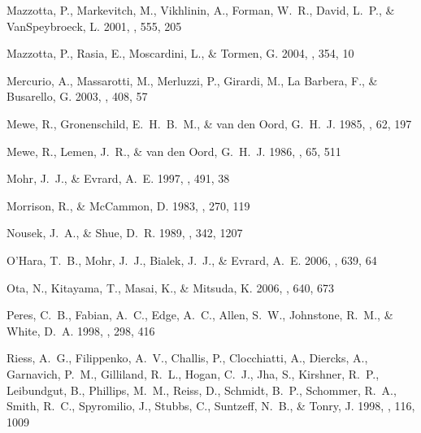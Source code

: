 \documentclass[12pt,preprint]{aastex}
\begin{document}
\begin{thebibliography}{}
{Mazzotta}, P., {Markevitch}, M., {Vikhlinin}, A., {Forman}, W.~R., {David},
  L.~P., \& {VanSpeybroeck}, L. 2001, \apj, 555, 205

{Mazzotta}, P., {Rasia}, E., {Moscardini}, L., \& {Tormen}, G. 2004, \mnras,
  354, 10

{Mercurio}, A., {Massarotti}, M., {Merluzzi}, P., {Girardi}, M., {La Barbera},
  F., \& {Busarello}, G. 2003, \aap, 408, 57

{Mewe}, R., {Gronenschild}, E.~H.~B.~M., \& {van den Oord}, G.~H.~J. 1985,
  \aaps, 62, 197

{Mewe}, R., {Lemen}, J.~R., \& {van den Oord}, G.~H.~J. 1986, \aaps, 65, 511

{Mohr}, J.~J., \& {Evrard}, A.~E. 1997, \apj, 491, 38

{Morrison}, R., \& {McCammon}, D. 1983, \apj, 270, 119

{Nousek}, J.~A., \& {Shue}, D.~R. 1989, \apj, 342, 1207

{O'Hara}, T.~B., {Mohr}, J.~J., {Bialek}, J.~J., \& {Evrard}, A.~E. 2006, \apj,
  639, 64

{Ota}, N., {Kitayama}, T., {Masai}, K., \& {Mitsuda}, K. 2006, \apj, 640, 673

{Peres}, C.~B., {Fabian}, A.~C., {Edge}, A.~C., {Allen}, S.~W., {Johnstone},
  R.~M., \& {White}, D.~A. 1998, \mnras, 298, 416

{Riess}, A.~G., {Filippenko}, A.~V., {Challis}, P., {Clocchiatti}, A.,
  {Diercks}, A., {Garnavich}, P.~M., {Gilliland}, R.~L., {Hogan}, C.~J., {Jha},
  S., {Kirshner}, R.~P., {Leibundgut}, B., {Phillips}, M.~M., {Reiss}, D.,
  {Schmidt}, B.~P., {Schommer}, R.~A., {Smith}, R.~C., {Spyromilio}, J.,
  {Stubbs}, C., {Suntzeff}, N.~B., \& {Tonry}, J. 1998, \aj, 116, 1009


\end{thebibliography}
\end{document}
